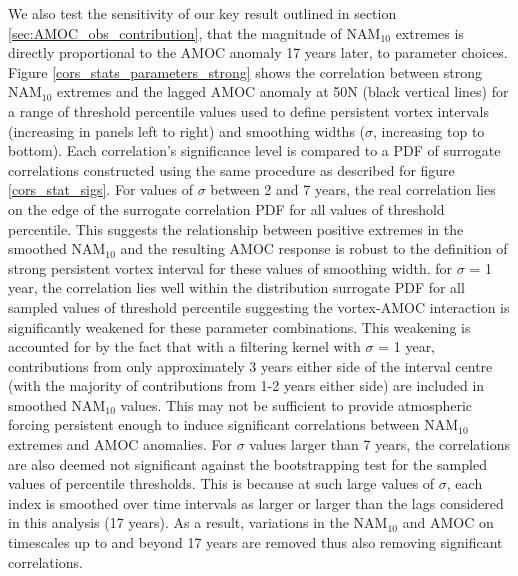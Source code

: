 We also test the sensitivity of our key result outlined in section \ref{sec:AMOC_obs_contribution}, that the magnitude of NAM$_{10}$ extremes is directly proportional to the AMOC anomaly 17 years later, to parameter choices. Figure \ref{cors_stats_parameters_strong} shows the correlation between strong NAM$_{10}$ extremes and the lagged AMOC anomaly at 50N (black vertical lines) for a range of threshold percentile values used to define persistent vortex intervals (increasing in panels left to right) and smoothing widths ($\sigma$, increasing top to bottom). Each correlation's significance level is compared to a PDF of surrogate correlations constructed using the same procedure as described for figure \ref{cors_stat_sigs}. For values of $\sigma$ between 2 and 7 years, the real correlation lies on the edge of the surrogate correlation PDF for all values of threshold percentile. This suggests the relationship between positive extremes in the smoothed NAM$_{10}$ and the resulting AMOC response is robust to the definition of strong persistent vortex interval for these values of smoothing width. for $\sigma$ = 1 year, the correlation lies well within the distribution surrogate PDF for all sampled values of threshold percentile suggesting the vortex-AMOC interaction is significantly weakened for these parameter combinations. This weakening is accounted for by the fact that with a filtering kernel with $\sigma$ = 1 year, contributions from only approximately 3 years either side of the interval centre (with the majority of contributions from 1-2 years either side) are included in smoothed NAM$_{10}$ values. This may not be sufficient to provide atmospheric forcing persistent enough to induce significant correlations between NAM$_{10}$ extremes and AMOC anomalies. For $\sigma$ values larger than 7 years, the correlations are also deemed not significant against the bootstrapping test for the sampled values of percentile thresholds. This is because at such large values of $\sigma$, each index is smoothed over time intervals as larger or larger than the lags considered in this analysis (17 years). As a result, variations in the NAM$_{10}$ and AMOC on timescales up to and beyond 17 years are removed thus also removing significant correlations.

